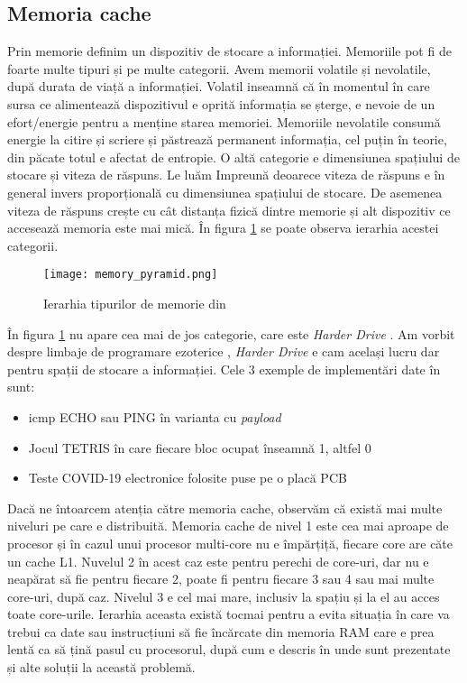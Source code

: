 \documentclass[../main.tex]{subfiles}
\begin{document}
\subsection{Memoria cache}
Prin memorie definim un dispozitiv de stocare a informației. Memoriile pot fi de foarte multe tipuri și pe multe categorii.
Avem memorii volatile și nevolatile, după durata de viață a informației. Volatil inseamnă că în momentul în care sursa
ce alimentează dispozitivul e oprită informația se șterge, e nevoie de un efort/energie pentru a menține starea memoriei.
Memoriile nevolatile consumă energie la citire și scriere și păstrează permanent informația, cel puțin în teorie, din păcate
totul e afectat de entropie. O altă categorie e dimensiunea spațiului de stocare și viteza de răspuns. Le luăm Impreună
deoarece viteza de răspuns e în general invers proporțională cu dimensiunea spațiului de stocare. De asemenea viteza de
răspuns crește cu cât distanța fizică dintre memorie și alt dispozitiv ce accesează memoria este mai mică. În figura
\ref{fig:memory_pyramid} se poate observa ierarhia acestei categorii.

\begin{figure}[h]
    \centering
    \texttt{[image: memory\_pyramid.png]}
    \caption{Ierarhia tipurilor de memorie din \cite{cache}}
    \label{fig:memory_pyramid}
\end{figure}

În figura \ref{fig:memory_pyramid} nu apare cea mai de jos categorie, care este \emph{Harder Drive} \cite{harderdrive}. 
Am vorbit despre limbaje de programare ezoterice \cite{esolangs}, \emph{Harder Drive} \cite{harderdrive} e cam același 
lucru dar pentru spații de stocare a informației. Cele 3 exemple de implementări date în \cite{harderdrive} sunt:
\begin{itemize}
    \item \acrshort{icmp} ECHO sau PING în varianta cu \emph{payload}
    \item Jocul TETRIS în care fiecare bloc ocupat înseamnă 1, altfel 0
    \item Teste COVID-19 electronice folosite puse pe o placă PCB
\end{itemize}

Dacă ne întoarcem atenția către memoria cache, observăm că există mai multe niveluri pe care e distribuită. Memoria cache
de nivel 1 este cea mai aproape de procesor și în cazul unui procesor multi-core nu e împărțiță, fiecare core are căte un
cache L1. Nuvelul 2 în acest caz este pentru perechi de core-uri, dar nu e neapărat să fie pentru fiecare 2, poate fi pentru
fiecare 3 sau 4 sau mai multe core-uri, după caz. Nivelul 3 e cel mai mare, inclusiv la spațiu și la el au acces toate
core-urile. Ierarhia aceasta există tocmai pentru a evita situația în care va trebui ca date sau instrucțiuni să fie încărcate
din memoria RAM care e prea lentă ca să țină pasul cu procesorul, după cum e descris în \cite{bottleneck} unde sunt prezentate 
și alte soluții la această problemă.
\end{document}
